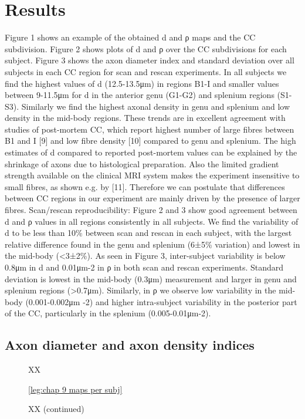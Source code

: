 \section{Results}
Figure 1 shows an example of the obtained d and ρ maps and the CC subdivision. Figure 2 shows plots of d and ρ over the CC subdivisions for each subject. Figure 3 shows the axon diameter index and standard deviation over all subjects in each CC region for scan and rescan experiments. In all subjects we find the highest values of d (12.5-13.5μm) in regions B1-I and smaller values between 9-11.5μm for d in the anterior genu (G1-G2) and splenium regions (S1-S3).  Similarly we find the highest axonal density in genu and splenium and low density in the mid-body regions. These trends are in excellent agreement with studies of post-mortem CC, which report highest number of large fibres between B1 and I [9] and low fibre density [10] compared to genu and splenium. The high estimates of d compared to reported post-mortem values can be explained by the shrinkage of axons due to histological preparation. Also the limited gradient strength available on the clinical MRI system makes the experiment insensitive to small fibres, as shown e.g. by [11]. Therefore we can postulate that differences between CC regions in our experiment are mainly driven by the presence of larger fibres. 
Scan/rescan reproducibility:  Figure 2 and 3 show good agreement between d and ρ values in all regions consistently in all subjects. We find the variability of d to be less than 10\% between scan and rescan in each subject, with the largest relative difference found in the genu and splenium (6±5\% variation) and lowest in the mid-body (<3±2\%). As seen in Figure 3, inter-subject variability is below 0.8μm in d and 0.01μm-2 in ρ in both scan and rescan experiments. Standard deviation is lowest in the mid-body (0.3μm) measurement and larger in genu and splenium regions (>0.7μm). Similarly, in ρ we observe low variability in the mid-body (0.001-0.002μm -2) and higher intra-subject variability in the posterior part of the CC, particularly in the splenium (0.005-0.01μm-2). 

\subsection*{Axon diameter and axon density indices}
\begin{figure}[ht\textbf{]}
	\centering
	\subfloat[]
	{
	}
	\caption{XX}
	\label{fig:chap9 scan rescan maps per subject}	
\end{figure}	
\begin{figure}[ht]
    \ContinuedFloat 
	\centering
	\ref{leg:chap 9 maps per subj}
	\caption{XX (continued)}
	\label{fig:chap9 scan rescan maps per subject}
\end{figure}

